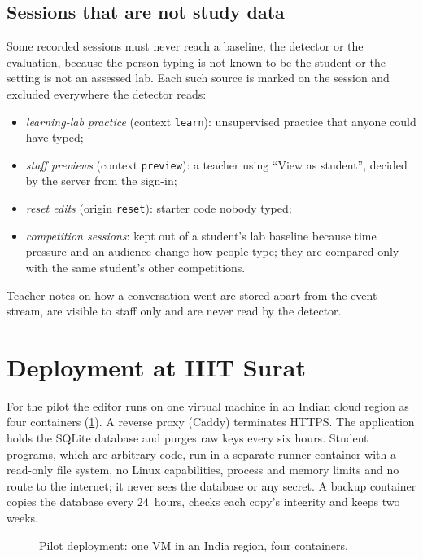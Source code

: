 \subsection{Sessions that are not study data}
\label{sec:non-study}
Some recorded sessions must never reach a baseline, the detector or the
evaluation, because the person typing is not known to be the student or the
setting is not an assessed lab. Each such source is marked on the session and
excluded everywhere the detector reads:
\begin{itemize}[nosep]
  \item \emph{learning-lab practice} (context \texttt{learn}): unsupervised
  practice that anyone could have typed;
  \item \emph{staff previews} (context \texttt{preview}): a teacher using
  ``View as student'', decided by the server from the sign-in;
  \item \emph{reset edits} (origin \texttt{reset}): starter code nobody typed;
  \item \emph{competition sessions}: kept out of a student's lab baseline
  because time pressure and an audience change how people type; they are
  compared only with the same student's other competitions.
\end{itemize}
Teacher notes on how a conversation went are stored apart from the event
stream, are visible to staff only and are never read by the detector.

\section{Deployment at IIIT Surat}
\label{sec:deployment}
For the pilot the editor runs on one virtual machine in an Indian cloud region
as four containers (\cref{fig:deployment}). A reverse proxy (Caddy) terminates
HTTPS. The application holds the SQLite database and purges raw keys every six
hours. Student programs, which are arbitrary code, run in a separate runner
container with a read-only file system, no Linux capabilities, process and
memory limits and no route to the internet; it never sees the database or any
secret. A backup container copies the database every 24~hours, checks each
copy's integrity and keeps two weeks.

\begin{figure}[ht]
  \centering
  \caption{Pilot deployment: one VM in an India region, four containers.}
  \label{fig:deployment}
\end{figure}

